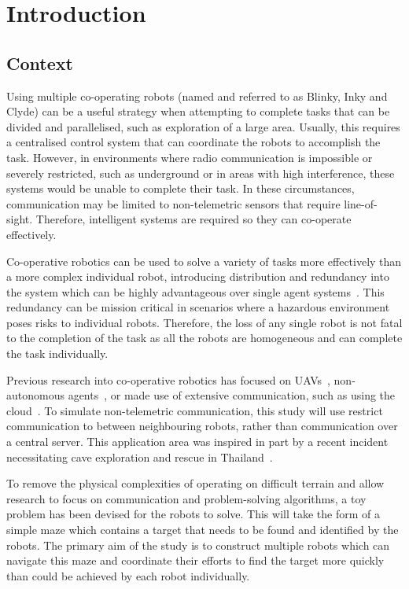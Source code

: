 
\chapter{Introduction}\label{introduction}
\section{Context}\label{introduction/context}
Using multiple co-operating robots (named and referred to as Blinky, Inky
and Clyde) can be a useful strategy when attempting to complete tasks that
can be divided and parallelised, such as exploration of a large area.
Usually, this requires a centralised control system that can
coordinate the robots to accomplish the task. However, in
environments where radio communication is impossible or severely restricted,
such as underground or in areas with high interference, these systems would
be unable to complete their task. In these circumstances, communication may
be limited to non-telemetric sensors that require line-of-sight. Therefore,
intelligent systems are required so they can co-operate effectively.

Co-operative robotics can be used to solve a variety of tasks more 
effectively than a more complex individual robot, introducing distribution
and redundancy into the system which can be highly advantageous over single 
agent systems~\cite{dudek96}. This redundancy can be mission critical in 
scenarios where a hazardous environment poses risks to individual robots. 
Therefore, the loss of any single robot is not fatal to the completion of the task as all
the robots are homogeneous and can complete the task individually.

Previous research into co-operative robotics has focused on UAVs~\cite{khan18},
non-autonomous agents~\cite{jimenez18}, or made use of extensive
communication, such as using the cloud~\cite{wensing2018cooperative}.
To simulate  non-telemetric communication, this study will use restrict
communication to between neighbouring robots, rather than communication over a 
central server. This
application area was inspired in part by a recent incident necessitating cave 
exploration and rescue in Thailand~\cite{bbcthailand}.

To remove the physical complexities of operating on difficult
terrain and allow research to focus on communication and problem-solving 
algorithms, a toy problem has been devised for the robots to solve. This
will take the form of a simple maze which contains a target that needs to
be found and identified by the robots. The primary aim of the study is to
construct multiple robots which can navigate this maze and coordinate their
efforts to find the target more quickly than could be achieved by each robot 
individually.

